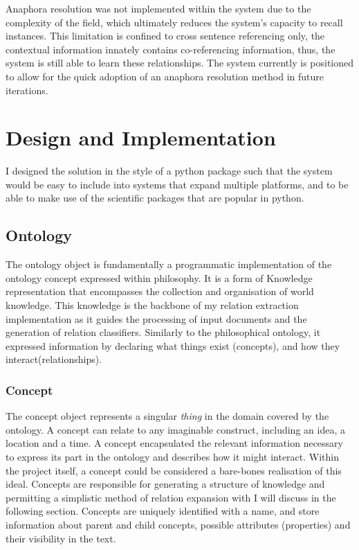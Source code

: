 \documentclass[12pt]{article} %
\begin{document}
Anaphora resolution was not implemented within the system due to the complexity of the field, which ultimately reduces the system’s capacity to recall instances. This limitation is confined to cross sentence referencing only, the contextual information innately contains co-referencing information, thus, the system is still able to learn these relationships. The system currently is positioned to allow for the quick adoption of an anaphora resolution method in future iterations.

\section{Design and Implementation}

I designed the solution in the style of a python package such that the system would be easy to include into systems that expand multiple platforms, and to be able to make use of the scientific packages that are popular in python.

\subsection{Ontology}

The ontology object is fundamentally a programmatic implementation of the ontology concept expressed within philosophy. It is a form of Knowledge representation that encompasses the collection and organisation of world knowledge. This knowledge is the backbone of my relation extraction implementation as it guides the processing of input documents and the generation of relation classifiers. Similarly to the philosophical ontology, it expressed information by declaring what things exist (concepts), and how they interact(relationships).

\subsubsection{Concept} \label{concept}

The concept object represents a singular \textit{thing} in the domain covered by the ontology. A concept can relate to any imaginable construct, including an idea, a location and a time. A concept encapsulated the relevant information necessary to express its part in the ontology and describes how it might interact. Within the project itself, a concept could be considered a bare-bones realisation of this ideal. Concepts are responsible for generating a structure of knowledge and permitting a simplistic method of relation expansion with I will discuss in the following section. Concepts are uniquely identified with a name, and store information about parent and child concepts, possible attributes (properties) and their visibility in the text.\\
\end{document}
